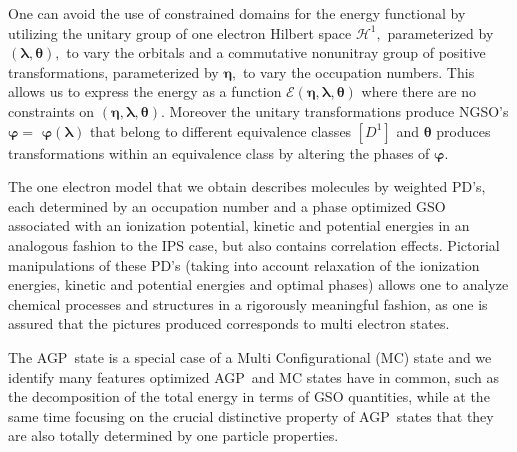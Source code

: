 \documentclass{preprint}
\begin{document}
One can avoid the use of constrained domains for the energy functional by
utilizing the unitary group of one electron Hilbert space $\mathcal{H}^{1},$
parameterized by $\left( \bm{\lambda},\bm{\theta}\right) ,$ to vary the
orbitals and a commutative nonunitray group of positive transformations,
parameterized by $\bm{\eta},$ to vary the occupation numbers. This allows us
to express the energy as a function $\mathcal{E}\left( \bm{\eta },%
\bm{\lambda},\bm{\theta}\right) $ where there are no constraints on $\left( %
\bm{\eta},\bm{\lambda},\bm{\theta}\right) .$ Moreover the unitary
transformations produce NGSO's $\bm{\varphi=}$ $\bm{\varphi}\left( %
\bm{\lambda}\right) $ that belong to different equivalence classes $\left[
D^{1}\right] $ and $\bm{\theta}$ produces transformations within an
equivalence class by altering the phases of $\bm{\varphi.}$

The one electron model that we obtain describes molecules by weighted PD's,
each determined by an occupation number and a phase optimized GSO associated
with an ionization potential, kinetic and potential energies in an analogous
fashion to the IPS case, but also contains correlation effects. Pictorial
manipulations of these PD's (taking into account relaxation of the
ionization energies, kinetic and potential energies and optimal phases)
allows one to analyze chemical processes and structures in a rigorously
meaningful fashion, as one is assured that the pictures produced corresponds
to multi electron states.

The AGP\ state is a special case of a Multi Configurational (MC) state and
we identify many features optimized AGP\ and MC states have in common, such
as the decomposition of the total energy in terms of GSO quantities, while
at the same time focusing on the crucial distinctive property of AGP\ states
that they are also totally determined by one particle properties.
\end{document}
